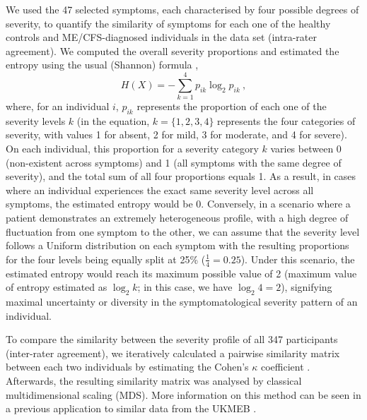 We used the 47 selected symptoms, each characterised by four possible degrees of severity, to quantify the similarity of symptoms for each one of the healthy controls and ME/CFS-diagnosed individuals in the data set (intra-rater agreement).
We computed the overall severity proportions and estimated the entropy using the usual (Shannon) formula \citep{shannon1948MathematicalTheory},
% 
$$H(X) = - \sum_{k = 1}^{4} p_{ik} \log_2 p_{ik} \ ,$$%
% 
where, for an individual $i$, $p_{ik}$ represents the proportion of each one of the severity levels $k$ (in the equation, $k = \{1, 2, 3, 4\}$ represents the four categories of severity, with values 1 for absent, 2 for mild, 3 for moderate, and 4 for severe).
On each individual, this proportion for a severity category $k$ varies between 0 (non-existent across symptoms) and 1 (all symptoms with the same degree of severity), and the total sum of all four proportions equals 1.
As a result, in cases where an individual experiences the exact same severity level across all symptoms, the estimated entropy would be 0.
Conversely, in a scenario where a patient demonstrates an extremely heterogeneous profile, with a high degree of fluctuation from one symptom to the other, we can assume that the severity level follows a Uniform distribution on each symptom with the resulting proportions for the four levels being equally split at 25\% ($\frac{1}{4} = 0.25$).
Under this scenario, the estimated entropy would reach its maximum possible value of 2 (maximum value of entropy estimated as $\log_2 k$; in this case, we have $\log_2 4 = 2$), signifying maximal uncertainty or diversity in the symptomatological severity pattern of an individual.

To compare the similarity between the severity profile of all 347 participants (inter-rater agreement), we iteratively calculated a pairwise similarity matrix between each two individuals by estimating the Cohen's $\kappa$ coefficient \citep{cohen1960CoefficientAgreement}.
Afterwards, the resulting similarity matrix was analysed by classical multidimensional scaling (MDS).
More information on this method can be seen in a previous application to similar data from the UKMEB \citep{malato2021Statisticalchallenges}.



